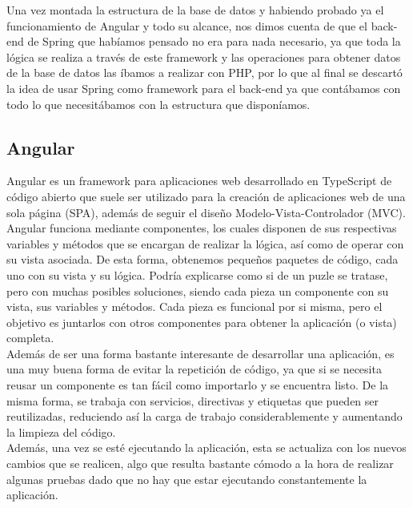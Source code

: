 Una vez montada la estructura de la base de datos y habiendo probado ya el funcionamiento de Angular y todo su alcance, nos dimos cuenta de que el back-end de Spring que habíamos pensado no era para nada necesario, ya que toda la lógica se realiza a través de este framework y las operaciones para obtener datos de la base de datos las íbamos a realizar con PHP, por lo que al final se descartó la idea de usar Spring como framework para el back-end ya que contábamos con todo lo que necesitábamos con la estructura que disponíamos.\\

\clearpage

\subsection{Angular}

Angular es un framework para aplicaciones web desarrollado en TypeScript de código abierto que suele ser utilizado para la creación de aplicaciones web de una sola página (SPA), además de seguir el diseño Modelo-Vista-Controlador (MVC).\\

Angular funciona mediante componentes, los cuales disponen de sus respectivas variables y métodos que se encargan de realizar la lógica, así como de operar con su vista asociada. De esta forma, obtenemos pequeños paquetes de código, cada uno con su vista y su lógica. Podría explicarse como si de un puzle se tratase, pero con muchas posibles soluciones, siendo cada pieza un componente con su vista, sus variables y métodos. Cada pieza es funcional por si misma, pero el objetivo es juntarlos con otros componentes para obtener la aplicación (o vista) completa.\\

Además de ser una forma bastante interesante de desarrollar una aplicación, es una muy buena forma de evitar la repetición de código, ya que si se necesita reusar un componente es tan fácil como importarlo y se encuentra listo. De la misma forma, se trabaja con servicios, directivas y etiquetas que pueden ser reutilizadas, reduciendo así la carga de trabajo considerablemente y aumentando la limpieza del código.\\

Además, una vez se esté ejecutando la aplicación, esta se actualiza con los nuevos cambios que se realicen, algo que resulta bastante cómodo a la hora de realizar algunas pruebas dado que no hay que estar ejecutando constantemente la aplicación.\\

